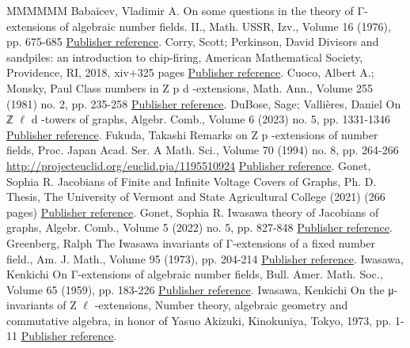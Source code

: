 \documentclass[11pt]{article}
\theoremstyle{definition}
\numberwithin{equation}{section}
\begin{document}
\begin{thebibliography}{MMMMMM}
 Babaĭcev, Vladimir A. On some questions in the theory of Γ-extensions of algebraic number fields. II., Math. USSR, Izv., Volume 16 (1976), pp. 675-685 \href{https://alco.centre-mersenne.org/articles/10.5802/alco.366/#babaichev}{Publisher reference}.
 Corry, Scott; Perkinson, David Divisors and sandpiles: an introduction to chip-firing, American Mathematical Society, Providence, RI, 2018, xiv+325 pages \href{https://alco.centre-mersenne.org/articles/10.5802/alco.366/#corry-Perkinson}{Publisher reference}.
 Cuoco, Albert A.; Monsky, Paul Class numbers in Z p d -extensions, Math. Ann., Volume 255 (1981) no. 2, pp. 235-258 \href{https://alco.centre-mersenne.org/articles/10.5802/alco.366/#cuoco-monsky}{Publisher reference}.
 DuBose, Sage; Vallières, Daniel On ℤ \(\ell\) d -towers of graphs, Algebr. Comb., Volume 6 (2023) no. 5, pp. 1331-1346 \href{https://alco.centre-mersenne.org/articles/10.5802/alco.366/#dubose-vallieres}{Publisher reference}.
 Fukuda, Takashi Remarks on Z p -extensions of number fields, Proc. Japan Acad. Ser. A Math. Sci., Volume 70 (1994) no. 8, pp. 264-266 \url{http://projecteuclid.org/euclid.pja/1195510924} \href{https://alco.centre-mersenne.org/articles/10.5802/alco.366/#fukuda}{Publisher reference}.
 Gonet, Sophia R. Jacobians of Finite and Infinite Voltage Covers of Graphs, Ph. D. Thesis, The University of Vermont and State Agricultural College (2021) (266 pages) \href{https://alco.centre-mersenne.org/articles/10.5802/alco.366/#diss-gonet}{Publisher reference}.
 Gonet, Sophia R. Iwasawa theory of Jacobians of graphs, Algebr. Comb., Volume 5 (2022) no. 5, pp. 827-848 \href{https://alco.centre-mersenne.org/articles/10.5802/alco.366/#gonet}{Publisher reference}.
 Greenberg, Ralph The Iwasawa invariants of Γ-extensions of a fixed number field., Am. J. Math., Volume 95 (1973), pp. 204-214 \href{https://alco.centre-mersenne.org/articles/10.5802/alco.366/#green_73}{Publisher reference}.
 Iwasawa, Kenkichi On Γ-extensions of algebraic number fields, Bull. Amer. Math. Soc., Volume 65 (1959), pp. 183-226 \href{https://alco.centre-mersenne.org/articles/10.5802/alco.366/#iwasawa}{Publisher reference}.
 Iwasawa, Kenkichi On the μ-invariants of Z \(\ell\) -extensions, Number theory, algebraic geometry and commutative algebra, in honor of Yasuo Akizuki, Kinokuniya, Tokyo, 1973, pp. 1-11 \href{https://alco.centre-mersenne.org/articles/10.5802/alco.366/#iwasawa_mu}{Publisher reference}.

\end{thebibliography}
\end{document}
